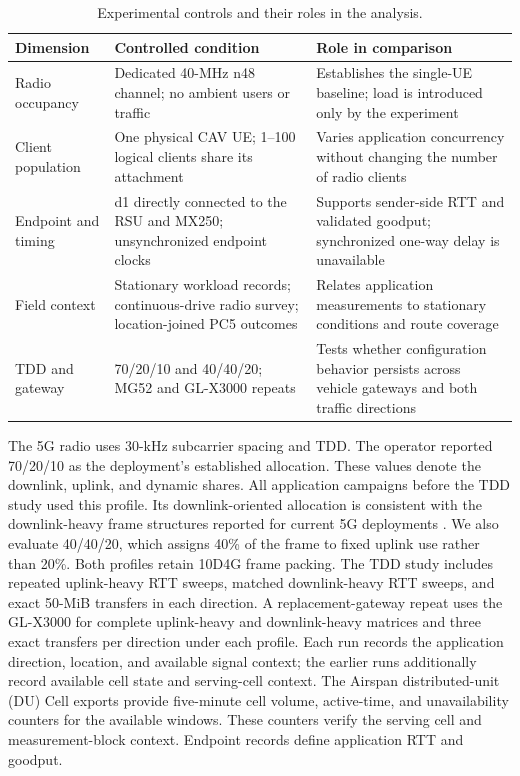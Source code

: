 \begin{table}[t]
  \caption{Experimental controls and their roles in the analysis.}
  \label{tab:deployment}
  \centering
  \footnotesize
  \setlength{\tabcolsep}{4pt}
  \renewcommand{\arraystretch}{1.12}
  \begin{tabular}{@{}C{0.15\textwidth}C{0.36\textwidth}C{0.41\textwidth}@{}}
    \toprule
    Dimension & Controlled condition & Role in comparison \\
    \midrule
    Radio occupancy & Dedicated 40-MHz n48 channel; no ambient users or traffic & Establishes the single-UE baseline; load is introduced only by the experiment \\
    Client population & One physical CAV UE; 1--100 logical clients share its attachment & Varies application concurrency without changing the number of radio clients \\
    Endpoint and timing & d1 directly connected to the RSU and MX250; unsynchronized endpoint clocks & Supports sender-side RTT and validated goodput; synchronized one-way delay is unavailable \\
    Field context & Stationary workload records; continuous-drive radio survey; location-joined PC5 outcomes & Relates application measurements to stationary conditions and route coverage \\
    TDD and gateway & 70/20/10 and 40/40/20; MG52 and GL-X3000 repeats & Tests whether configuration behavior persists across vehicle gateways and both traffic directions \\
    \bottomrule
  \end{tabular}
\end{table}

The 5G radio uses 30-kHz subcarrier spacing and TDD. The operator reported
70/20/10 as the deployment's established allocation. These values denote the
downlink, uplink, and dynamic shares. All application campaigns before the TDD
study used this profile. Its downlink-oriented allocation is consistent with
the downlink-heavy frame structures reported for current 5G deployments
\cite{ngmn2021tdd}. We also evaluate 40/40/20, which assigns 40\% of the frame
to fixed uplink use rather than 20\%. Both profiles retain 10D4G frame packing.
The TDD study includes repeated uplink-heavy RTT sweeps, matched downlink-heavy
RTT sweeps, and exact 50-MiB transfers in each direction. A replacement-gateway
repeat uses the GL-X3000 for complete uplink-heavy and downlink-heavy matrices
and three exact transfers per direction under each profile. Each run
records the application direction, location, and available signal context;
the earlier runs additionally record available cell state and serving-cell
context.
The Airspan distributed-unit (DU) Cell exports provide five-minute cell volume,
active-time, and unavailability counters for the available windows. These
counters verify the serving cell and measurement-block context. Endpoint
records define application RTT and goodput.

